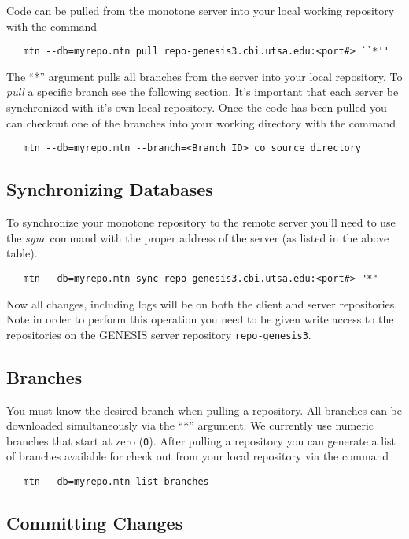 \documentclass[12pt]{article}
\begin{document}
\noindent Code can be pulled from the monotone server into your local working repository with the command
\begin{verbatim}
   mtn --db=myrepo.mtn pull repo-genesis3.cbi.utsa.edu:<port#> ``*''
\end{verbatim}
The ``*'' argument pulls all branches from the server into your local repository. To {\it pull} a specific branch see the following section. It's important that each server be synchronized with it's own local repository. Once the code has been pulled you can checkout one of the branches into your working directory with the command
\begin{verbatim}
   mtn --db=myrepo.mtn --branch=<Branch ID> co source_directory 
\end{verbatim}

\subsection*{Synchronizing Databases}

To synchronize your monotone repository to the remote server you'll need to use the {\it sync} command with the proper address of the server (as listed in the above table).
\begin{verbatim}
   mtn --db=myrepo.mtn sync repo-genesis3.cbi.utsa.edu:<port#> "*" 
\end{verbatim}
Now all changes, including logs will be on both the client and server repositories. Note in order to perform this operation you need to be given write access to the repositories on the GENESIS server repository {\tt repo-genesis3}.

\subsection*{Branches}

You must know the desired branch when pulling a repository. All branches can be downloaded simultaneously via the ``*'' argument. We currently use numeric branches that start at zero ({\tt 0}). After pulling a repository you can generate a list of branches available for check out from your local repository via the command
\begin{verbatim}
   mtn --db=myrepo.mtn list branches 
\end{verbatim}

\subsection*{Committing Changes}
\end{document}
